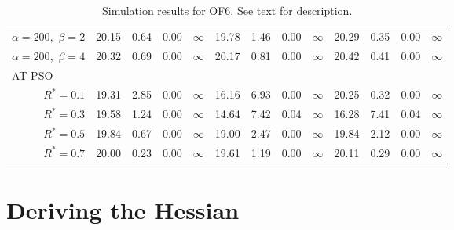 \documentclass[12pt]{article}
\begin{document}
\begin{table}[ht]
{\begin{tabular}{r|rrrr|rrrr|rrrr}
  $\alpha = 200,$ $\beta =2$ & 20.15 & 0.64 & 0.00 & $\infty$ & 19.78 & 1.46 & 0.00 & $\infty$ & 20.29 & 0.35 & 0.00 & $\infty$ \\ 
  $\alpha = 200,$ $\beta =4$ & 20.32 & 0.69 & 0.00 & $\infty$ & 20.17 & 0.81 & 0.00 & $\infty$ & 20.42 & 0.41 & 0.00 & $\infty$ \\ 
\hline
\multicolumn{1}{l|}{AT-PSO} &&&&&&&&&&&&\\
  $R^* = 0.1$ & 19.31 & 2.85 & 0.00 & $\infty$ & 16.16 & 6.93 & 0.00 & $\infty$ & 20.25 & 0.32 & 0.00 & $\infty$ \\ 
  $R^* = 0.3$ & 19.58 & 1.24 & 0.00 & $\infty$ & 14.64 & 7.42 & 0.04 & $\infty$ & 16.28 & 7.41 & 0.04 & $\infty$ \\ 
  $R^* = 0.5$ & 19.84 & 0.67 & 0.00 & $\infty$ & 19.00 & 2.47 & 0.00 & $\infty$ & 19.84 & 2.12 & 0.00 & $\infty$ \\ 
  $R^* = 0.7$ & 20.00 & 0.23 & 0.00 & $\infty$ & 19.61 & 1.19 & 0.00 & $\infty$ & 20.11 & 0.29 & 0.00 & $\infty$ \\ 
   \hline
\end{tabular}
}
\caption{Simulation results for OF6. See text for description.}
\label{tab:psosim6}
\end{table}

\section{Deriving the Hessian}\label{app:hess}
\end{document}
